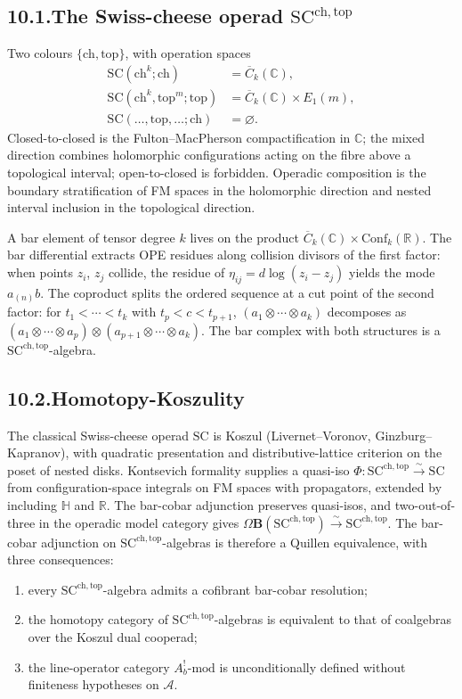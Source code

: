\documentclass[11pt,reqno]{amsart}
\theoremstyle{definition}
\theoremstyle{remark}
\providecommand{\cA}{\mathcal{A}}
\providecommand{\FM}{\overline{C}}
\providecommand{\bC}{\mathbb{C}}
\providecommand{\bR}{\mathbb{R}}
\providecommand{\SCchtop}{\mathrm{SC}^{\mathrm{ch,top}}}
\providecommand{\Conf}{\mathrm{Conf}}
\providecommand{\SC}{\mathrm{SC}}
\numberwithin{equation}{section}
\begin{document}
\subsection*{10.1.\enspace The Swiss-cheese operad
$\SCchtop$}

Two colours $\{\mathrm{ch}, \mathrm{top}\}$, with operation
spaces
\begin{align*}
\SC(\mathrm{ch}^k; \mathrm{ch}) &= \FM_k(\bC),\\
\SC(\mathrm{ch}^k, \mathrm{top}^m; \mathrm{top})
&= \FM_k(\bC) \times E_1(m),\\
\SC(\ldots, \mathrm{top}, \ldots; \mathrm{ch}) &= \varnothing.
\end{align*}
Closed-to-closed is the Fulton--MacPherson compactification in
$\bC$; the mixed direction combines holomorphic configurations
acting on the fibre above a topological interval; open-to-closed
is forbidden. Operadic composition is the boundary stratification
of FM spaces in the holomorphic direction and nested interval
inclusion in the topological direction.

A bar element of tensor degree $k$ lives on the product
$\FM_k(\bC) \times \Conf_k(\bR)$. The bar differential extracts
OPE residues along collision divisors of the first factor: when
points $z_i$, $z_j$ collide, the residue of
$\eta_{ij} = d\log(z_i - z_j)$ yields the mode $a_{(n)}b$. The
coproduct splits the ordered sequence at a cut point of the
second factor: for $t_1 < \cdots < t_k$ with $t_p < c < t_{p+1}$,
$(a_1\otimes\cdots\otimes a_k)$ decomposes as
$(a_1\otimes\cdots\otimes a_p)\otimes(a_{p+1}\otimes\cdots\otimes a_k)$.
The bar complex with both structures is a
$\SCchtop$-algebra.

\subsection*{10.2.\enspace Homotopy-Koszulity}

The classical Swiss-cheese operad $\SC$ is Koszul
(Livernet--Voronov, Ginzburg--Kapranov), with quadratic
presentation and distributive-lattice criterion on the poset
of nested disks. Kontsevich formality supplies a quasi-iso
$\Phi\colon \SCchtop \xrightarrow{\sim} \SC$ from
configuration-space integrals on FM spaces with propagators,
extended by including $\mathbb H$ and $\bR$. The bar-cobar
adjunction preserves quasi-isos, and two-out-of-three in the
operadic model category gives
$\Omega\mathbf B(\SCchtop) \xrightarrow{\sim} \SCchtop$. The
bar-cobar adjunction on $\SCchtop$-algebras is therefore a
Quillen equivalence, with three consequences:
\begin{enumerate}[label=(\roman*),nosep]
\item every $\SCchtop$-algebra admits a cofibrant bar-cobar
resolution;
\item the homotopy category of $\SCchtop$-algebras is
equivalent to that of coalgebras over the Koszul dual
cooperad;
\item the line-operator category $A_b^!\text{-mod}$ is
unconditionally defined without finiteness hypotheses on $\cA$.
\end{enumerate}
\end{document}
